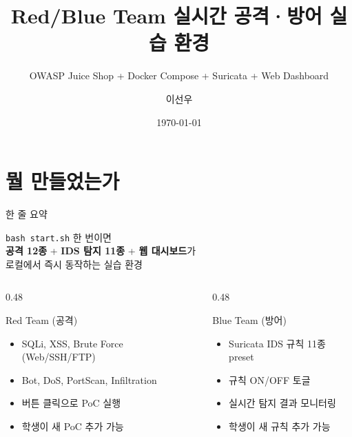 \documentclass[aspectratio=169,10pt]{beamer}
\title{Red/Blue Team 실시간 공격·방어 실습 환경}
\subtitle{OWASP Juice Shop + Docker Compose + Suricata + Web Dashboard}
\author{이선우}
\institute{KENTECH STIS Lab}
\date{\today}
\newcommand{\hlt}[1]{\textcolor{accent}{\textbf{#1}}}
\newcommand{\blue}[1]{\textcolor{blueTeam}{\textbf{#1}}}
\begin{document}
\maketitle

\section{뭘 만들었는가}

\begin{frame}{한 줄 요약}
\begin{center}
\Large
\texttt{bash start.sh} 한 번이면\\[0.3em]
\hlt{공격 12종} + \blue{IDS 탐지 11종} + \hlt{웹 대시보드}가\\[0.3em]
로컬에서 즉시 동작하는 실습 환경
\end{center}

\vspace{1em}
\begin{columns}[T]
\begin{column}{0.48\textwidth}
\begin{block}{Red Team (공격)}
\begin{itemize}
    \item SQLi, XSS, Brute Force (Web/SSH/FTP)
    \item Bot, DoS, PortScan, Infiltration
    \item 버튼 클릭으로 PoC 실행
    \item 학생이 새 PoC 추가 가능
\end{itemize}
\end{block}
\end{column}
\begin{column}{0.48\textwidth}
\begin{block}{Blue Team (방어)}
\begin{itemize}
    \item Suricata IDS 규칙 11종 preset
    \item 규칙 ON/OFF 토글
    \item 실시간 탐지 결과 모니터링
    \item 학생이 새 규칙 추가 가능
\end{itemize}
\end{block}
\end{column}
\end{columns}
\end{frame}

\end{document}
